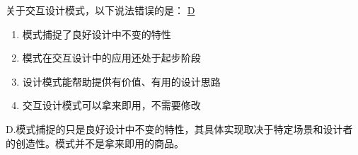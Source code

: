 \begin{problem}
	‍关于交互设计模式，以下说法错误的是：
	\uline{D}    
    \vspace{-0.8em}
    \begin{multicols}{2}
        \begin{enumerate}[label=\Alph*.]
            \item 模式捕捉了良好设计中不变的特性
            \item 模式在交互设计中的应用还处于起步阶段
            \item 设计模式能帮助提供有价值、有用的设计思路
            \item 交互设计模式可以拿来即用，不需要修改
        \end{enumerate}
    \end{multicols}
    \vspace{-1em}
\end{problem}

\begin{solution}
D.模式捕捉的只是良好设计中不变的特性，其具体实现取决于特定场景和设计者的创造性。模式并不是拿来即用的商品。
\end{solution}